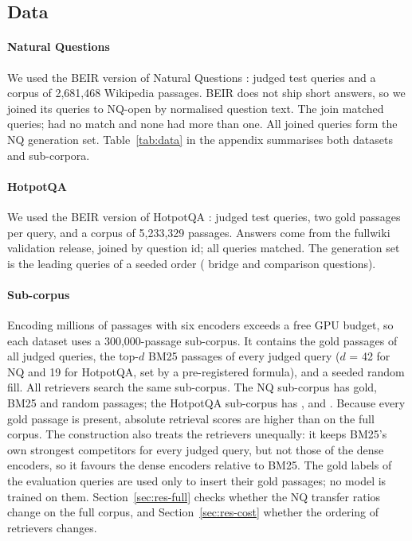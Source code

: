 \subsection{Data}\label{sec:data}
\paragraph{Natural Questions}
We used the BEIR version of Natural Questions \citep{kwiatkowski2019nq,thakur2021beir}:  judged test queries and a corpus of 2,681,468 Wikipedia passages. BEIR does not ship short answers, so we joined its queries to NQ-open \citep{lee2019orqa} by normalised question text. The join matched  queries;  had no match and none had more than one. All  joined queries form the NQ generation set. Table~\ref{tab:data} in the appendix summarises both datasets and sub-corpora.

\paragraph{HotpotQA}
We used the BEIR version of HotpotQA \citep{yang2018hotpotqa,thakur2021beir}:  judged test queries, two gold passages per query, and a corpus of 5,233,329 passages. Answers come from the fullwiki validation release, joined by question id; all queries matched. The generation set is the leading  queries of a seeded order ( bridge and  comparison questions).

\paragraph{Sub-corpus}
Encoding millions of passages with six encoders exceeds a free GPU budget, so each dataset uses a 300,000-passage sub-corpus. It contains the gold passages of all judged queries, the top-$d$ BM25 passages of every judged query ($d$ = 42 for NQ and 19 for HotpotQA, set by a pre-registered formula), and a seeded random fill. All retrievers search the same sub-corpus. The NQ sub-corpus has  gold,  BM25 and  random passages; the HotpotQA sub-corpus has ,  and . Because every gold passage is present, absolute retrieval scores are higher than on the full corpus. The construction also treats the retrievers unequally: it keeps BM25's own strongest competitors for every judged query, but not those of the dense encoders, so it favours the dense encoders relative to BM25. The gold labels of the evaluation queries are used only to insert their gold passages; no model is trained on them. Section~\ref{sec:res-full} checks whether the NQ transfer ratios change on the full corpus, and Section~\ref{sec:res-cost} whether the ordering of retrievers changes.

